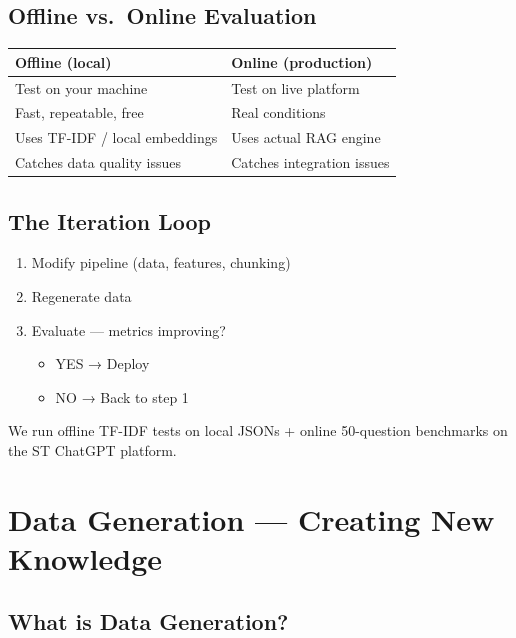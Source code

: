 \documentclass[11pt,a4paper]{report}
\begin{document}
\section{Offline vs.\ Online Evaluation}

\begin{table}[h]
\centering
\begin{tabularx}{\textwidth}{X X}
\toprule
\textbf{Offline (local)} & \textbf{Online (production)} \\
\midrule
Test on your machine & Test on live platform \\
Fast, repeatable, free & Real conditions \\
Uses TF-IDF / local embeddings & Uses actual RAG engine \\
Catches data quality issues & Catches integration issues \\
\bottomrule
\end{tabularx}
\end{table}

\section{The Iteration Loop}

\begin{enumerate}
    \item Modify pipeline (data, features, chunking)
    \item Regenerate data
    \item Evaluate --- metrics improving?
    \begin{itemize}
        \item YES → Deploy
        \item NO → Back to step 1
    \end{itemize}
\end{enumerate}

\begin{projectbox}
We run offline TF-IDF tests on local JSONs + online 50-question benchmarks on the ST ChatGPT platform.
\end{projectbox}

\chapter{Data Generation --- Creating New Knowledge}

\section{What is Data Generation?}
\end{document}
